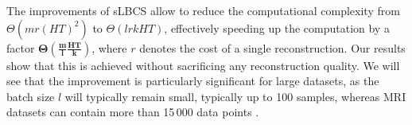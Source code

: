 The improvements of sLBCS allow to reduce the computational complexity from\linebreak $\Theta\left(mr(HT)^2\right)$ to $\Theta\left(lrkHT\right)$, effectively speeding up the computation by a factor $\mathbf{\Theta(\frac{m}{l}\frac{HT}{k})}$, where $r$ denotes the cost of a single reconstruction. Our results show that this is achieved without sacrificing any reconstruction quality. We will see that the improvement is particularly significant for large datasets, as the batch size $l$ will typically remain small, typically up to 100 samples, whereas MRI datasets can contain more than 15\,000 data points \citep{zbontarFastMRIOpenDataset2019}.





